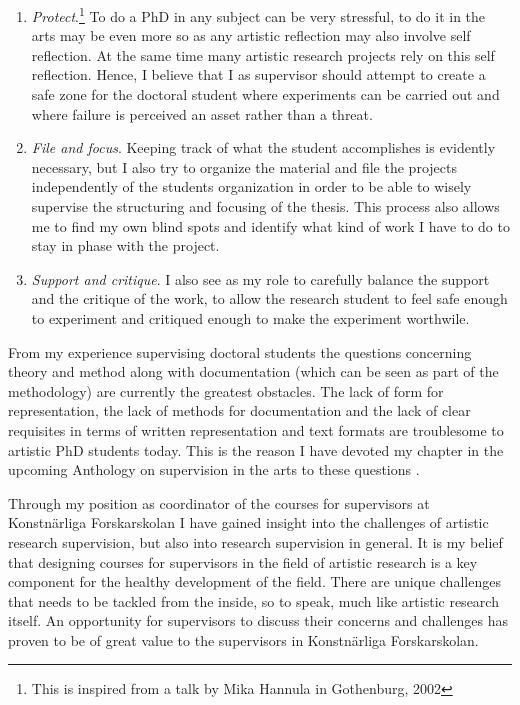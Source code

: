\documentclass[a4paper]{article}
\begin{document}
\begin{enumerate}
\item \emph{Protect}.\footnote{This is inspired from a talk by Mika Hannula in Gothenburg, 2002} To do a PhD in any subject can be very stressful, to do it in the arts may be even more so as any artistic reflection may also involve self reflection. At the same time many artistic research projects rely on this self reflection. Hence, I believe that I as supervisor should attempt to create a safe zone for the doctoral student where experiments can be carried out and where failure is perceived an asset rather than a threat.
\item \emph{File and focus}. Keeping track of what the student accomplishes is evidently necessary, but I also try to organize the material and file the projects independently of the students organization in order to be able to wisely supervise the structuring and focusing of the thesis. This process also allows me to find my own blind spots and identify what kind of work I have to do to stay in phase with the project.
\item \emph{Support and critique}. I also see as my role to carefully balance the support and the critique of the work, to allow the research student to feel safe enough to experiment and critiqued enough to make the experiment worthwile.
\end{enumerate}

From my experience supervising doctoral students the questions concerning theory and method along with documentation (which can be seen as part of the methodology) are currently the greatest obstacles. The lack of form for representation, the lack of methods for documentation and the lack of clear requisites in terms of written representation and text formats are troublesome to artistic PhD students today. This is the reason I have devoted my chapter in the upcoming Anthology on supervision in the arts to these questions \citep{frisk2015}.

Through my position as coordinator of the courses for supervisors at Konstnärliga Forskarskolan I have gained insight into the challenges of artistic research supervision, but also into research supervision in general. It is my belief that designing courses for supervisors in the field of artistic research is a key component for the healthy development of the field. There are unique challenges that needs to be tackled from the inside, so to speak, much like artistic research itself. An opportunity for supervisors to discuss their concerns and challenges has proven to be of great value to the supervisors in Konstnärliga Forskarskolan.
\end{document}
